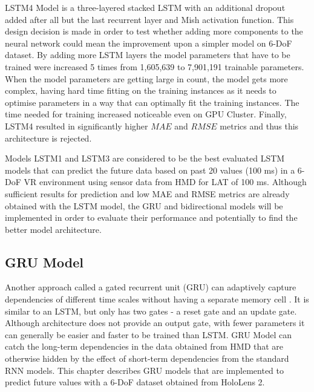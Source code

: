 LSTM4 Model is a three-layered stacked LSTM with an additional dropout  added after all but the last recurrent layer and Mish activation function. This design decision is made in order to test whether adding more components to the neural network could mean the improvement upon a simpler model on 6-DoF dataset. By adding more LSTM layers the model parameters that have to be trained were increased 5 times from 1,605,639 to 7,901,191 trainable parameters. When the model parameters are getting large in count, the model gets more complex, having hard time fitting on the training instances as it needs to optimise parameters in a way that can optimally fit the training instances. The time needed for training increased noticeable even on GPU Cluster. Finally, LSTM4 resulted in significantly higher $MAE$ and $RMSE$ metrics and thus this architecture is rejected.  

Models LSTM1 and LSTM3 are considered to be the best evaluated LSTM models that can predict the future data based on past 20 values (100 ms) in a 6-DoF VR environment using sensor data from HMD for LAT of 100 ms. Although sufficient results for prediction and low MAE and RMSE metrics are already obtained with the LSTM model, the GRU and bidirectional models will be implemented in order to evaluate their performance and potentially to find the better model architecture.

\subsection{GRU Model}
\label{sec:impl:model:arch:gru}
Another approach called a gated recurrent unit (GRU) can adaptively capture dependencies of different time scales without having a separate memory cell \cite{empirical_evaluation}. It is similar to an LSTM, but only has two gates - a reset gate and an update gate. Although architecture does not provide an output gate, with fewer parameters it can generally be easier and faster to be trained than LSTM. GRU Model can catch the long-term dependencies in the data obtained from HMD that are otherwise hidden by the effect of short-term dependencies from the standard RNN models. This chapter describes GRU models that are implemented to predict future values with a 6-DoF dataset obtained from HoloLens 2. 

